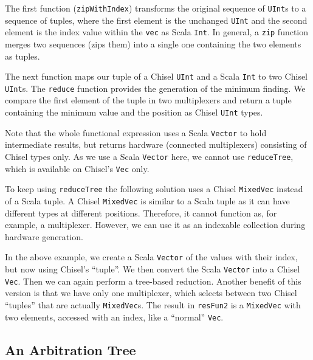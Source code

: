 \documentclass[%
    10pt,
    headinclude, footexclude,
    openright, %
    notitlepage,
    cleardoubleempty,
    headsepline,
    pointlessnumbers,
    bibtotoc, idxtotoc,
    ]{scrbook}
\newcommand{\code}[1]{{\lstinline[basicstyle=\small\ttfamily]{#1}}}
\newcommand{\todo}[1]{{\emph{TODO: #1}}}
\renewcommand{\todo}[1]{}
\begin{document}
\todo{This should be in a listing to have the right order between examples.}


The first function (\code{zipWithIndex})
transforms the original sequence of \code{UInt}s to a sequence of tuples, where the first element is the
unchanged \code{UInt} and the second element is the index value within the \code{vec} as Scala \code{Int}.
In general, a \code{zip} function merges two sequences (zips them) into a single one
containing the two elements as tuples.

The next function maps our tuple of a Chisel \code{UInt}
and a Scala \code{Int} to two Chisel \code{UInt}s. The \code{reduce} function provides the generation of
the minimum finding. We compare the first element of the tuple in two multiplexers and return
a tuple containing the minimum value and the position as Chisel \code{UInt} types.


Note that the whole functional expression uses a Scala \code{Vector} to hold intermediate results,
but returns hardware (connected multiplexers) consisting of Chisel types only.
As we use a Scala \code{Vector} here, we cannot use \code{reduceTree}, which is available on Chisel's
\code{Vec} only.

To keep using \code{reduceTree} the following solution uses a Chisel \code{MixedVec}
instead of a Scala tuple.
A Chisel \code{MixedVec} is similar to a Scala tuple as it can have different types at different positions.
Therefore, it cannot function as, for example, a multiplexer. However, we can use it as an
indexable collection during hardware generation.



In the above example, we create a Scala \code{Vector} of the values with their index, but now
using Chisel's ``tuple''. We then convert the Scala \code{Vector} into a Chisel \code{Vec}.
Then we can again perform a tree-based reduction. Another benefit of this version is
that we have only one multiplexer, which selects between two Chisel ``tuples'' that are actually
\code{MixedVec}s.
The result in \code{resFun2} is a \code{MixedVec} with two elements,
accessed with an index, like a ``normal'' \code{Vec}.

\subsection{An Arbitration Tree}
\label{sec:arbiter}
\end{document}
